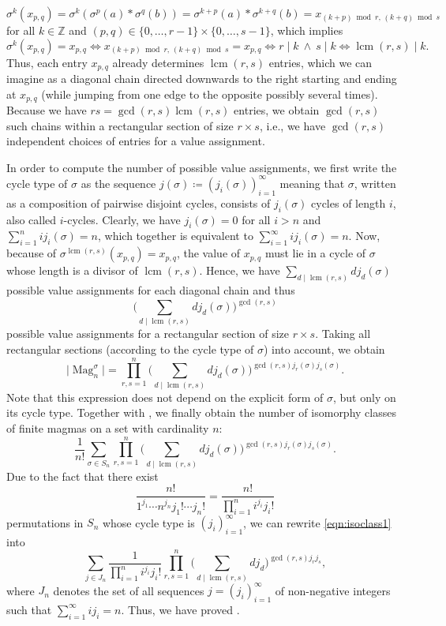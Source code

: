 \documentclass[12pt]{article}
\let\Cref\crtCref
\DeclareMathOperator{\lcm}{lcm}
\DeclareMathOperator{\Mag}{Mag}
\theoremstyle{definition}
\theoremstyle{remark}
\begin{document}
	\[
	\sigma^k(x_{p,q})=\sigma^k(\sigma^p(a)\ast\sigma^q(b)) = \sigma^{k+p}(a) \ast \sigma^{k+q}(b) = x_{(k+p)\bmod r,\, (k+q)\bmod s}
	\]
	for all $k\in\mathbb Z$ and $(p,q)\in \{0,\dots,r-1\} \times \{0,\dots,s-1\}$, which implies
	\[
	\sigma^k(x_{p,q}) = x_{p,q} \iff x_{(k+p)\bmod r,\, (k+q)\bmod s} = x_{p,q} \iff r \mid k \ \land \ s \mid k \iff \lcm(r,s) \mid k.
	\]
	Thus, each entry $x_{p,q}$ already determines $\lcm(r,s)$ entries, which we can imagine as a diagonal chain directed downwards to the right starting and ending at $x_{p,q}$ (while jumping from one edge to the opposite possibly several times). Because we have $rs = \gcd(r,s)\lcm(r,s)$ entries, we obtain $\gcd(r,s)$ such chains within a rectangular section of size $r\times s$, i.e., we have $\gcd(r,s)$ independent choices of entries for a value assignment.
	
	In order to compute the number of possible value assignments, we first write the cycle type of $\sigma$ as the sequence $j(\sigma)\coloneqq(j_i(\sigma))_{i=1}^{\infty}$ meaning that $\sigma$, written as a composition of pairwise disjoint cycles, consists of $j_i(\sigma)$ cycles of length $i$, also called $i$-cycles. Clearly, we have $j_i(\sigma) = 0$ for all $i > n$ and $\sum_{i=1}^{n} ij_i(\sigma) = n$, which together is equivalent to $\sum_{i=1}^{\infty} ij_i(\sigma) = n$. Now, because of $\sigma^{\lcm(r,s)}(x_{p,q}) = x_{p,q}$, the value of $x_{p,q}$ must lie in a cycle of $\sigma$ whose length is a divisor of $\lcm(r,s)$. Hence, we have $\sum_{d\mid\lcm(r,s)} d j_d(\sigma)$ possible value assignments for each diagonal chain and thus
	\[\bigg(\sum_{d\mid\lcm(r,s)} d j_d(\sigma)\bigg)^{\gcd(r,s)}\]
	possible value assignments for a rectangular section of size $r \times s$. Taking all rectangular sections (according to the cycle type of $\sigma$) into account, we obtain
	\[
	\lvert\Mag_n^\sigma\rvert = \prod_{r,s=1}^n \bigg(\sum_{d\mid\lcm(r,s)} d j_d(\sigma)\bigg)^{\gcd(r,s)j_r(\sigma)j_s(\sigma)}.
	\]
	Note that this expression does not depend on the explicit form of $\sigma$, but only on its cycle type. Together with \Cref{lem:orb}, we finally obtain the number of isomorphy classes of finite magmas on a set with cardinality $n$:
	\begin{equation}\label{eqn:isoclass1}
	\frac{1}{n!}\sum_{\sigma\in S_n} \prod_{r,s=1}^n \bigg(\sum_{d\mid\lcm(r,s)} d j_d(\sigma)\bigg)^{\gcd(r,s)j_r(\sigma)j_s(\sigma)}.
	\end{equation}
	Due to the fact that there exist
	\[
	\frac{n!}{1^{j_1}\cdots n^{j_n} j_1! \cdots j_n!} = \frac{n!}{\prod_{i=1}^n i^{j_i} j_i!}
	\]
	permutations in $S_n$ whose cycle type is $(j_i)_{i=1}^{\infty}$, we can rewrite \eqref{eqn:isoclass1} into
	\begin{equation}\label{eqn:isoclass2}
	\sum_{j \in J_n} \frac{1}{\prod_{i=1}^n i^{j_i} j_i!} \prod_{r,s=1}^n \bigg(\sum_{d\mid\lcm(r,s)} d j_d\bigg)^{\gcd(r,s)j_rj_s},
	\end{equation}
	where $J_n$ denotes the set of all sequences $j=(j_i)_{i=1}^{\infty}$ of non-negative integers such that $\sum_{i=1}^{\infty} ij_i = n$. Thus, we have proved \Cref{thm:main}.
	
\end{document}
